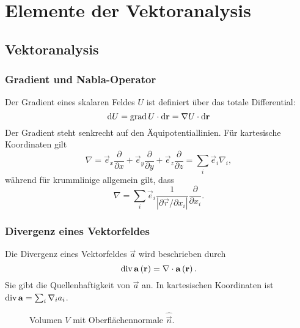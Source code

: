 

\chapter{Elemente der Vektoranalysis\label{elemente_der_vektoranalysis}}

\section{Vektoranalysis}

\subsection{Gradient und Nabla-Operator}

Der Gradient eines skalaren Feldes $U$ ist definiert über das totale Differential:
\begin{equation*}
	\mathop{}\!\mathrm{d} U=\operatorname{grad} U\cdot \mathop{}\!\mathrm{d} \mathbf{r}=\nabla U\cdot \mathop{}\!\mathrm{d} \mathbf{r}
\end{equation*}
Der Gradient steht senkrecht auf den Äquipotentiallinien. Für kartesische Koordinaten gilt
\begin{equation*}
	\nabla =\vec {e}_{x}\frac{\partial }{\partial x}+\vec {e}_{y}\frac{\partial }{\partial y}+\vec {e}_{z}\frac{\partial }{\partial z}=\sum _{i}\vec {e}_{i}\nabla _{i},
\end{equation*}
während für krummlinige allgemein gilt, dass
\begin{equation*}
	\nabla =\sum _{i}\vec {e}_{i}\frac{1}{\left| \partial \vec {r}/\partial x_{i}\right| }\frac{\partial }{\partial x_{i}}.
\end{equation*}
\subsection{Divergenz eines Vektorfeldes\label{ref-007}}

Die Divergenz eines Vektorfeldes $\vec {a}$ wird beschrieben durch
\begin{equation*}
	\operatorname{div} \mathbf{a}\left(\mathbf{r}\right)=\nabla \cdot \mathbf{a}\left(\mathbf{r}\right).
\end{equation*}
Sie gibt die Quellenhaftigkeit von $\vec {a}$ an. In kartesischen Koordinaten ist $\operatorname{div} \mathbf{a}=\sum _{i}\nabla _{i}a_{i}$.



\begin{figure}[htb]
	\centering
	\tfigVolumeWithNormal
	\caption{Volumen $V$ mit Oberflächennormale $\hat{\vec{n}}$. }
	\label{fig:volume_with_normal}
\end{figure}

